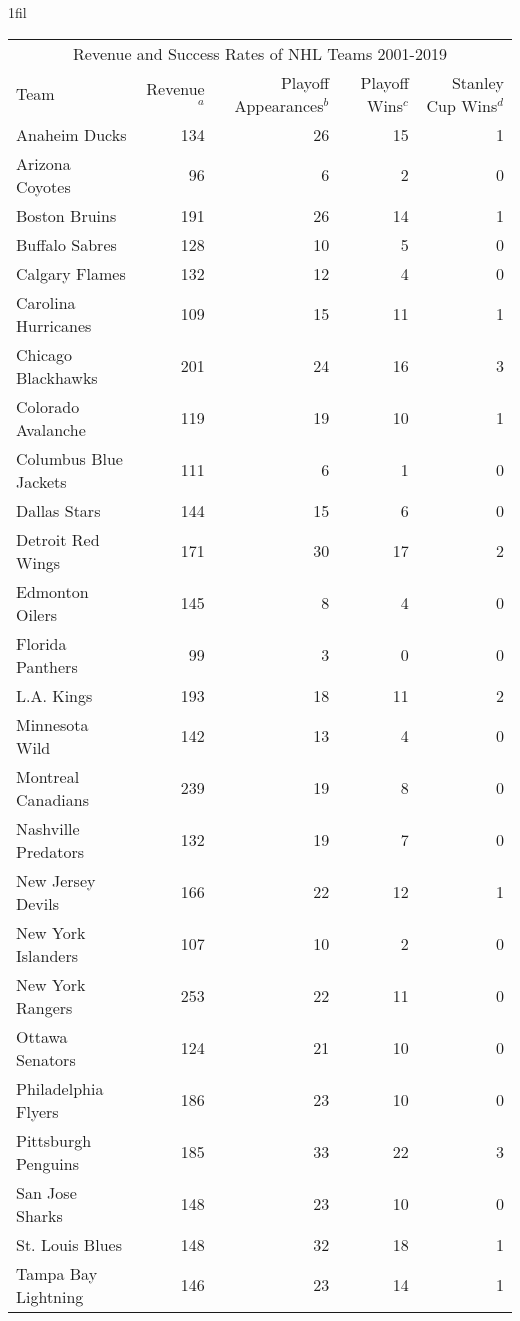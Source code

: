 \documentclass[11pt]{report}            %
\makeatletter
\newcommand*{\centerfloat}{%
  \parindent \z@
  \leftskip \z@ \@plus 1fil \@minus \textwidth
  \rightskip\leftskip
  \parfillskip \z@skip}
\makeatother
\begin{document}
\begin{table}[htp]
\centerfloat
\begin{tabular}{lrrrr}
\hline
\multicolumn{5}{c}{Revenue and Success Rates of NHL Teams 2001-2019} \\
Team & Revenue$^a$ & Playoff Appearances$^b$ & Playoff Wins$^c$ & Stanley Cup Wins$^d$ \\ 
\hline
Anaheim Ducks & 134 &  26 &  15 &   1 \\ 
Arizona Coyotes &  96 &   6 &   2 &   0 \\ 
Boston Bruins & 191 &  26 &  14 &   1 \\ 
Buffalo Sabres & 128 &  10 &   5 &   0 \\ 
Calgary Flames & 132 &  12 &   4 &   0 \\ 
Carolina Hurricanes & 109 &  15 &  11 &   1 \\ 
Chicago Blackhawks & 201 &  24 &  16 &   3 \\ 
Colorado Avalanche & 119 &  19 &  10 &   1 \\ 
Columbus Blue Jackets & 111 &   6 &   1 &   0 \\ 
Dallas Stars & 144 &  15 &   6 &   0 \\ 
Detroit Red Wings & 171 &  30 &  17 &   2 \\ 
Edmonton Oilers & 145 &   8 &   4 &   0 \\ 
Florida Panthers &  99 &   3 &   0 &   0 \\ 
L.A. Kings & 193 &  18 &  11 &   2 \\ 
Minnesota Wild & 142 &  13 &   4 &   0 \\ 
Montreal Canadians & 239 &  19 &   8 &   0 \\ 
Nashville Predators & 132 &  19 &   7 &   0 \\ 
New Jersey Devils & 166 &  22 &  12 &   1 \\ 
New York Islanders & 107 &  10 &   2 &   0 \\ 
New York Rangers & 253 &  22 &  11 &   0 \\ 
Ottawa Senators & 124 &  21 &  10 &   0 \\ 
Philadelphia Flyers & 186 &  23 &  10 &   0 \\ 
Pittsburgh Penguins & 185 &  33 &  22 &   3 \\ 
San Jose Sharks & 148 &  23 &  10 &   0 \\ 
St. Louis Blues & 148 &  32 &  18 &   1 \\ 
Tampa Bay Lightning & 146 &  23 &  14 &   1 \\ 

\end{tabular}
\end{table}
\end{document}
